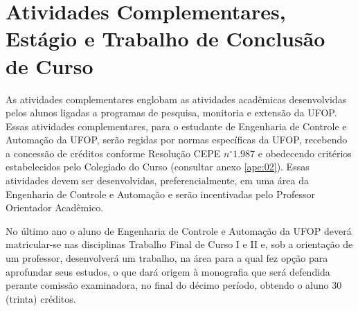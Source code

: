 \section{Atividades Complementares, Estágio e Trabalho de Conclusão de Curso}
As atividades complementares englobam as atividades acadêmicas desenvolvidas pelos alunos ligadas a programas de pesquisa, monitoria e extensão da UFOP. Essas atividades complementares, para o estudante de Engenharia de Controle e Automação da UFOP, serão regidas por normas específicas da UFOP, recebendo a concessão de créditos conforme Resolução CEPE $n^{\circ} 1.987$ e obedecendo critérios estabelecidos pelo Colegiado do Curso (consultar anexo \ref{ape:02}). Essas atividades devem ser desenvolvidas, preferencialmente, em uma área da Engenharia de Controle e Automação e serão incentivadas pelo Professor Orientador Acadêmico. 

No último ano o aluno de Engenharia de Controle e Automação da UFOP deverá matricular-se nas disciplinas Trabalho Final de Curso I e II e, sob a orientação de um professor, desenvolverá um trabalho, na área para a qual fez opção para aprofundar seus estudos, o que dará origem à monografia que será defendida perante comissão examinadora, no final do décimo período, obtendo o aluno 30 (trinta) créditos.